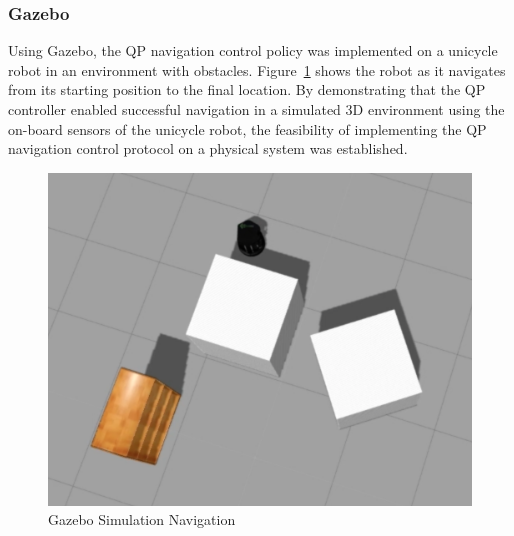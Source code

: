 \documentclass[journal]{IEEEtran}
\begin{document}
\subsubsection{Gazebo}
Using Gazebo, the QP navigation control policy was implemented on a unicycle robot in an environment with obstacles. Figure~\ref{fig:gazebo} shows the robot as it navigates from its starting position to the final location. By demonstrating that the QP controller enabled successful navigation in a simulated 3D environment using the on-board sensors of the unicycle robot, the feasibility of implementing the QP navigation control protocol on a physical system was established. 

\begin{figure}[h!]
\centering
\includegraphics[scale=0.45]{Gazebo_exp.png} 
\caption{Gazebo Simulation Navigation\label{fig:gazebo}}
\end{figure}
\end{document}

